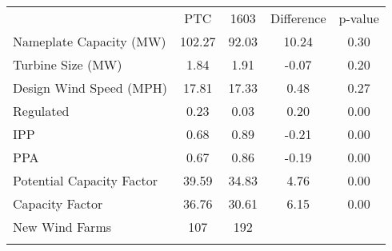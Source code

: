 \begin{center}
\begin{tabular}{lcccc}
\hline \noalign{\smallskip} & PTC & 1603 & Difference & p-value\\
\noalign{\smallskip}\hline Nameplate Capacity (MW) & 102.27 & 92.03 & 10.24 & 0.30\\
Turbine Size (MW) & 1.84 & 1.91 & -0.07 & 0.20\\
Design Wind Speed (MPH) & 17.81 & 17.33 & 0.48 & 0.27\\
Regulated & 0.23 & 0.03 & 0.20 & 0.00\\
IPP & 0.68 & 0.89 & -0.21 & 0.00\\
PPA & 0.67 & 0.86 & -0.19 & 0.00\\
Potential Capacity Factor & 39.59 & 34.83 & 4.76 & 0.00\\
Capacity Factor & 36.76 & 30.61 & 6.15 & 0.00\\
\hline \noalign{\smallskip}New Wind Farms & 107 & 192 &  & \\
\noalign{\smallskip}\hline\end{tabular}\\
\end{center}
